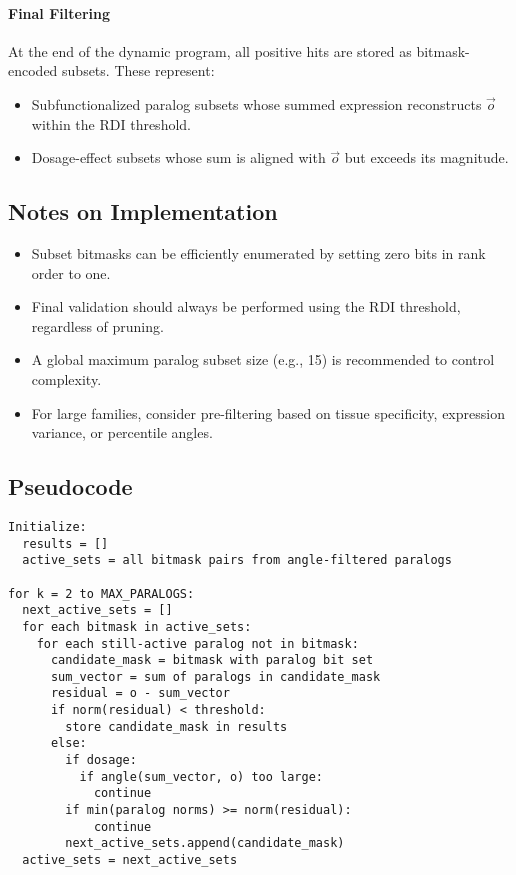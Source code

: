 \documentclass{article}
\begin{document}
\paragraph{Final Filtering}
At the end of the dynamic program, all positive hits are stored as bitmask-encoded subsets. These represent:
\begin{itemize}
    \item Subfunctionalized paralog subsets whose summed expression reconstructs $\vec{o}$ within the RDI threshold.
    \item Dosage-effect subsets whose sum is aligned with $\vec{o}$ but exceeds its magnitude.
\end{itemize}

\subsection{Notes on Implementation}

\begin{itemize}
    \item Subset bitmasks can be efficiently enumerated by setting zero bits in rank order to one.
    \item Final validation should always be performed using the RDI threshold, regardless of pruning.
    \item A global maximum paralog subset size (e.g., 15) is recommended to control complexity.
    \item For large families, consider pre-filtering based on tissue specificity, expression variance, or percentile angles.
\end{itemize}

\subsection{Pseudocode}

\begin{verbatim}
Initialize:
  results = []
  active_sets = all bitmask pairs from angle-filtered paralogs

for k = 2 to MAX_PARALOGS:
  next_active_sets = []
  for each bitmask in active_sets:
    for each still-active paralog not in bitmask:
      candidate_mask = bitmask with paralog bit set
      sum_vector = sum of paralogs in candidate_mask
      residual = o - sum_vector
      if norm(residual) < threshold:
        store candidate_mask in results
      else:
        if dosage:
          if angle(sum_vector, o) too large:
            continue
        if min(paralog norms) >= norm(residual):
            continue
        next_active_sets.append(candidate_mask)
  active_sets = next_active_sets
\end{verbatim}
\end{document}
